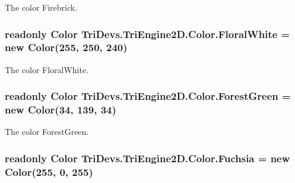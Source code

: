 The color Firebrick. 

\hypertarget{struct_tri_devs_1_1_tri_engine2_d_1_1_color_a6ae1c909867eb636b122bb522e4ea695}{
\subsubsection[{Floral\-White}]{\setlength{\rightskip}{0pt plus 5cm}readonly {\bf Color} Tri\-Devs.\-Tri\-Engine2\-D.\-Color.\-Floral\-White = new {\bf Color}(255, 250, 240)\hspace{0.3cm}{\ttfamily [static]}}}\label{struct_tri_devs_1_1_tri_engine2_d_1_1_color_a6ae1c909867eb636b122bb522e4ea695}


The color Floral\-White. 

\hypertarget{struct_tri_devs_1_1_tri_engine2_d_1_1_color_a2551a5837f3ded4fee9d9508c1f797bc}{
\subsubsection[{Forest\-Green}]{\setlength{\rightskip}{0pt plus 5cm}readonly {\bf Color} Tri\-Devs.\-Tri\-Engine2\-D.\-Color.\-Forest\-Green = new {\bf Color}(34, 139, 34)\hspace{0.3cm}{\ttfamily [static]}}}\label{struct_tri_devs_1_1_tri_engine2_d_1_1_color_a2551a5837f3ded4fee9d9508c1f797bc}


The color Forest\-Green. 

\hypertarget{struct_tri_devs_1_1_tri_engine2_d_1_1_color_a2f2c02d21a08bd08d0079599f6740675}{
\subsubsection[{Fuchsia}]{\setlength{\rightskip}{0pt plus 5cm}readonly {\bf Color} Tri\-Devs.\-Tri\-Engine2\-D.\-Color.\-Fuchsia = new {\bf Color}(255, 0, 255)\hspace{0.3cm}{\ttfamily [static]}}}\label{struct_tri_devs_1_1_tri_engine2_d_1_1_color_a2f2c02d21a08bd08d0079599f6740675}


